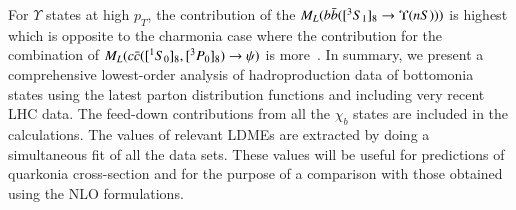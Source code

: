 For $\Upsilon$ states at high  $p_T$, the contribution of the  
$M_{L}(b{\bar{b}}([^3S_1]_{8}\rightarrow \Upsilon(nS)))$ is highest which is opposite to the charmonia 
case where the contribution for the combination of  $M_{L}(c{\bar{c}}([^1S_0]_{8},[^3P_0]_{8})\rightarrow \psi)$ 
is more~\cite{Kumar:2016ojy}.
In summary, we present a comprehensive lowest-order analysis of hadroproduction data of bottomonia 
states using the latest parton distribution functions and including very recent LHC data. The feed-down
contributions from all the $\chi_{b}$ states are included in the calculations. The values of relevant LDMEs
are extracted by doing a simultaneous fit of all the data sets. These values will be useful for predictions
of quarkonia cross-section and for the purpose of a comparison with those obtained using the NLO formulations.
